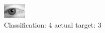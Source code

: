 \begin{figure}[h!]
\begin{center}
\includegraphics[width=0.60\columnwidth]{figures/ID2860_class_4_target_3.png}
\end{center}
\caption{ Classification: 4 actual target: 3}
\label{fig:ID2860_class_4_target_3}
\end{figure}

